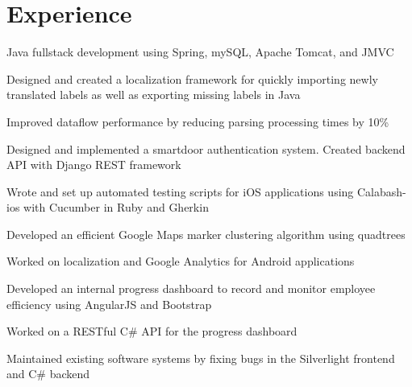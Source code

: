 \documentclass[]{peter_resume}
\begin{document}
\begin{minipage}[t]{0.66\textwidth} 


\section{Experience}

\vspace{\topsep} %
\begin{tightemize}
\item Java fullstack development using Spring, mySQL, Apache Tomcat, and JMVC
\item Designed and created a localization framework for quickly importing newly translated labels as well as exporting missing labels in Java
\item Improved dataflow performance by reducing parsing processing times by 10\%
\end{tightemize}
\sectionsep

\begin{tightemize}
\item Designed and implemented a smartdoor authentication system. Created backend API with Django REST framework
\item Wrote and set up automated testing scripts for iOS applications using Calabash-ios with Cucumber in Ruby and Gherkin
\item Developed an efficient Google Maps marker clustering algorithm using quadtrees
\item Worked on localization and Google Analytics for Android applications
\end{tightemize}
\sectionsep

\begin{tightemize}
\item Developed an internal progress dashboard to record and monitor employee efficiency using AngularJS and Bootstrap
\item Worked on a RESTful C\# API for the progress dashboard
\item Maintained existing software systems by fixing bugs in the Silverlight frontend and C\# backend
\end{tightemize}
\sectionsep


\end{minipage}
\end{document}
